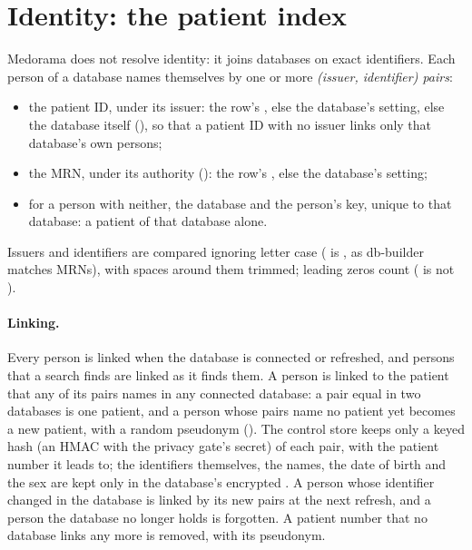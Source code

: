 \section{Identity: the patient index}
\label{sec:connecting-identity}
\label{sec:connecting-registry}


Medorama does not resolve identity: it joins databases on exact identifiers. Each person of a
database names themselves by one or more \emph{(issuer, identifier) pairs}:
\begin{itemize}
\item the patient ID, under its issuer: the row's , else the database's
   setting, else the database itself (), so that a patient ID with no
  issuer links only that database's own persons;
\item the MRN, under its authority (): the row's ,
  else the database's  setting;
\item for a person with neither, the database and the person's key, unique to that database: a
  patient of that database alone.
\end{itemize}
Issuers and identifiers are compared ignoring letter case ( is , as
db-builder matches MRNs), with spaces around them trimmed; leading zeros count
( is not ).

\paragraph{Linking.} Every person is linked when the database is connected or refreshed, and
persons that a search finds are linked as it finds them. A person is linked to the patient that
any of its pairs names in any connected database: a pair equal in two databases is one patient,
and a person whose pairs name no patient yet becomes a new patient, with a random pseudonym
(). The control store keeps only a keyed hash (an HMAC with the privacy gate's
secret) of each pair, with the patient number it leads to; the identifiers themselves, the names,
the date of birth and the sex are kept only in the database's encrypted .
A person whose identifier changed in the database is linked by its new pairs at the next
refresh, and a person the database no longer holds is forgotten. A patient number that no
database links any more is removed, with its pseudonym.

